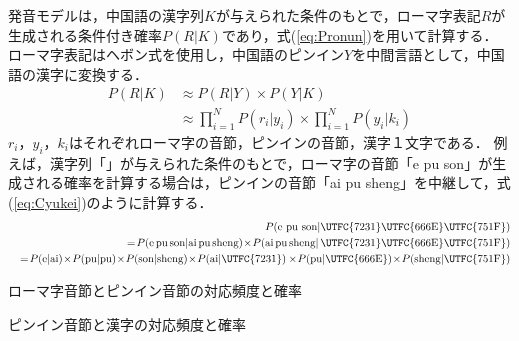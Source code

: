 \documentclass[japanese]{jnlp_1.4}
\begin{document}
{発音モデルは，中国語の漢字列$K$が与えられた条件のもとで，ローマ字表記$R$が生成される条件付き確率$P(R|K)$であり，式(\ref{eq:Pronun})を用いて計算する．
ローマ字表記はヘボン式を使用し，中国語のピンイン$Y$を中間言語として，中国語の漢字に変換する．
\begin{equation}
 \begin{split}
  P(R|K)&\approx P(R|Y)\times P(Y|K) \\
        &\approx\prod_{i=1}^N P(r_{i}|y_{i})\times\prod_{i=1}^N P(y_{i}|k_{i})\label{eq:Pronun}
 \end{split}
\end{equation}
$r_{i}$，$y_{i}$，$k_{i}$はそれぞれローマ字の音節，ピンインの音節，漢字１文字である．
例えば，漢字列「」が与えられた条件のもとで，ローマ字の音節「e pu son」が生成される確率を計算する場合は，ピンインの音節「ai pu sheng」を中継して，式(\ref{eq:Cyukei})のように計算する．
\begin{eqnarray}
&&P(\textrm{e pu son}|\textrm{\UTFC{7231}\UTFC{666E}\UTFC{751F}})\label{eq:Cyukei}\nonumber\\
&&=\!P(\textrm{e\,pu\,son}|\textrm{ai\,pu\,sheng})\!\times \!P(\textrm{ai\,pu\,sheng}|\,\textrm{\UTFC{7231}\UTFC{666E}\UTFC{751F}}) \nonumber\\
&&=\!P(\textrm{e}|\textrm{ai})\!\times \!P(\textrm{pu}|\textrm{pu})\!\times \!P(\textrm{son}|\textrm{sheng})\!\times \!P(\textrm{ai}|\textrm{\UTFC{7231}})\times \!P(\textrm{pu}|\textrm{\UTFC{666E}})\!\times \!P(\textrm{sheng}|\textrm{\UTFC{751F}})
\end{eqnarray}

\begin{table}[b]
\caption{ローマ字音節とピンイン音節の対応頻度と確率}
\label{table:Pry}

\end{table}
\begin{table}[b]
\caption{ピンイン音節と漢字の対応頻度と確率}
\label{table:Pyk}

\end{table}

}
\end{document}
